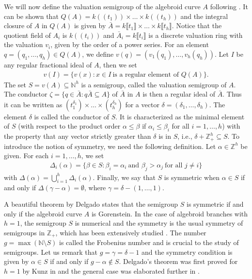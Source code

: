 \documentclass{amsart}%
\theoremstyle{plain}
\numberwithin{equation}{section}
\theoremstyle{definition}
\begin{document}
    We will now define the valuation semigroup of the algebroid curve $A$ following \cite{delgado}. It can be shown that $Q(A)=k((t_1))\times \ldots \times k((t_h))$ and the integral closure of $A$ in $Q(A)$ is given by $\bar{A}=k\llbracket t_1 \rrbracket\times\ldots\times k\llbracket t_h \rrbracket$. Notice that the quotient field of $A_i$ is $k((t_i))$ and $\bar{A}_i=k\llbracket t_i\rrbracket$ is a discrete valuation ring with the valuation $v_i$, given by the order of a power series. For an element $q=(q_1,\ldots,q_h)\in Q(A)$, we define $v(q)=(v_1(q_1),\ldots,v_h(q_h))$. Let $I$ be any regular fractional ideal of $A$, then we set
    \begin{align*}
        v(I)=\{v(x):x\in I \ \text{is a regular element of } Q(A)\}.
    \end{align*}
    The set $S=v(A)\subseteq \mathbb{N}^h$ is a semigroup, called the valuation semigroup of $A$. The conductor $\zeta=\{q\in \bar{A}:q \bar{A}\subseteq A\}$ of $\bar{A}$ in $A$ is then a regular ideal of $\bar{A}$. Thus it can be written as $\left(t_1^{\delta_1}\right)\times\ldots\times \left(t_h^{\delta_h}\right)$ for a vector $\delta=(\delta_1,\ldots,\delta_h)$. The element $\delta$ is called the conductor of $S$. It is characterized as the minimal element of $S$ (with respect to the product order $\alpha \le\beta$ if $\alpha_i\le \beta_i$ for all $i=1,\ldots,h$) with the property that any vector strictly greater than $\delta$ is in $S$, i.e., $\delta+\mathbb{Z}_+^h\subseteq S$. To introduce the notion of symmetry, we need the following definition. Let $\alpha\in \mathbb{Z}^h$ be given. For each $i=1,\ldots,h$, we set
    \begin{align*}
        \Delta_i(\alpha)=\{\beta\in S:\beta_i=\alpha_i \ \text{and } \beta_j>\alpha_j \ \text{for all } j\neq i\}
    \end{align*}
    with $\Delta(\alpha)=\bigcup_{i=1}^{h}\Delta_i(\alpha)$. Finally, we say that $S$ is symmetric when $\alpha\in S$ if and only if $\Delta(\gamma-\alpha)=\emptyset$, where $\gamma=\delta-(1,\ldots,1)$. \medskip
    
    A beautiful theorem by Delgado \cite{delgado} states that the semigroup $S$ is symmetric if and only if the algebroid curve $A$ is Gorenstein. In the case of algebroid branches with $h=1$, the semigroup $S$ is numerical and the symmetry is the usual symmetry of semigroups in $\mathbb{Z}_+$, which has been extensively studied \cite{apery,herzoggen}. The number $g=\max (\mathbb{N}\setminus S)$ is called the Frobenius number and is crucial to the study of semigroups. Let us remark that $g=\gamma=\delta-1$ and the symmetry condition is given by $\alpha\in S$ if and only if $g-\alpha\notin S$. Delgado's theorem was first proved for $h=1$ by Kunz in \cite{kunz} and the general case was elaborated further in \cite{campillo}.\medskip
\end{document}
